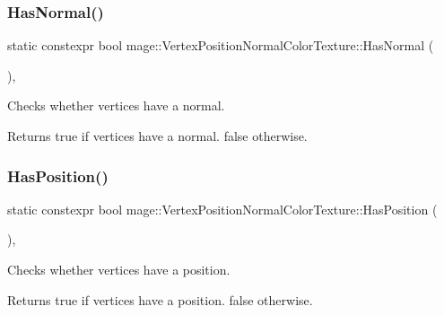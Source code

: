 \subsubsection{\texorpdfstring{Has\+Normal()}{HasNormal()}}
{\footnotesize\ttfamily static constexpr bool mage\+::\+Vertex\+Position\+Normal\+Color\+Texture\+::\+Has\+Normal (\begin{DoxyParamCaption}{ }\end{DoxyParamCaption})\hspace{0.3cm}{\ttfamily [static]}, {\ttfamily [noexcept]}}

Checks whether vertices have a normal.

\begin{DoxyReturn}{Returns}
{\ttfamily true} if vertices have a normal. {\ttfamily false} otherwise. 
\end{DoxyReturn}
\hypertarget{structmage_1_1_vertex_position_normal_color_texture_a493fdcc26dfbee8025da34f2d2600b1f}{}\label{structmage_1_1_vertex_position_normal_color_texture_a493fdcc26dfbee8025da34f2d2600b1f} 
\subsubsection{\texorpdfstring{Has\+Position()}{HasPosition()}}
{\footnotesize\ttfamily static constexpr bool mage\+::\+Vertex\+Position\+Normal\+Color\+Texture\+::\+Has\+Position (\begin{DoxyParamCaption}{ }\end{DoxyParamCaption})\hspace{0.3cm}{\ttfamily [static]}, {\ttfamily [noexcept]}}

Checks whether vertices have a position.

\begin{DoxyReturn}{Returns}
{\ttfamily true} if vertices have a position. {\ttfamily false} otherwise. 
\end{DoxyReturn}
\hypertarget{structmage_1_1_vertex_position_normal_color_texture_a27f5a115642f443419683417360fd58e}{}\label{structmage_1_1_vertex_position_normal_color_texture_a27f5a115642f443419683417360fd58e} 

